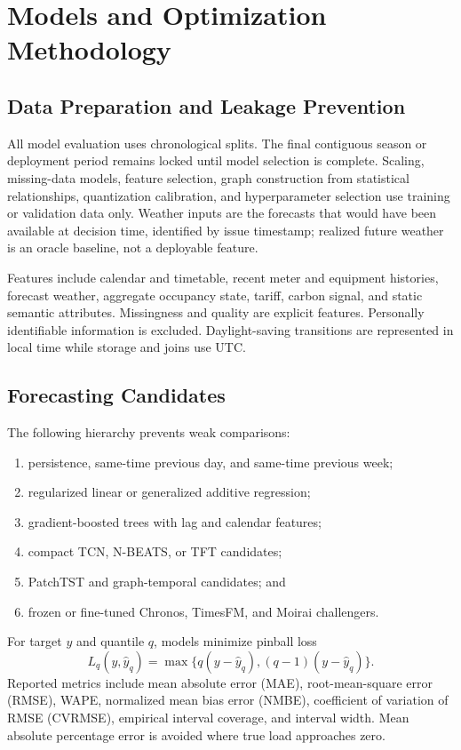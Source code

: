 \section{Models and Optimization Methodology}

\subsection{Data Preparation and Leakage Prevention}

All model evaluation uses chronological splits. The final contiguous season or deployment period remains locked until model selection is complete. Scaling, missing-data models, feature selection, graph construction from statistical relationships, quantization calibration, and hyperparameter selection use training or validation data only. Weather inputs are the forecasts that would have been available at decision time, identified by issue timestamp; realized future weather is an oracle baseline, not a deployable feature.

Features include calendar and timetable, recent meter and equipment histories, forecast weather, aggregate occupancy state, tariff, carbon signal, and static semantic attributes. Missingness and quality are explicit features. Personally identifiable information is excluded. Daylight-saving transitions are represented in local time while storage and joins use UTC.

\subsection{Forecasting Candidates}

The following hierarchy prevents weak comparisons:
\begin{enumerate}[leftmargin=*]
	\item persistence, same-time previous day, and same-time previous week;
	\item regularized linear or generalized additive regression;
	\item gradient-boosted trees with lag and calendar features;
	\item compact TCN, N-BEATS, or TFT candidates;
	\item PatchTST and graph-temporal candidates; and
	\item frozen or fine-tuned Chronos, TimesFM, and Moirai challengers.
\end{enumerate}

For target $y$ and quantile $q$, models minimize pinball loss
\begin{equation}
	L_q(y,\hat y_q)=\max\{q(y-\hat y_q),(q-1)(y-\hat y_q)\}.
	\label{eq:pinball}
\end{equation}
Reported metrics include mean absolute error (MAE), root-mean-square error (RMSE), WAPE, normalized mean bias error (NMBE), coefficient of variation of RMSE (CVRMSE), empirical interval coverage, and interval width. Mean absolute percentage error is avoided where true load approaches zero.

